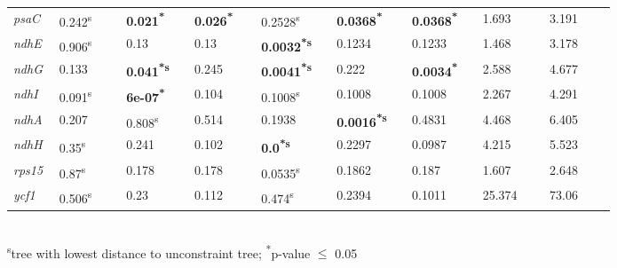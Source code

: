 \documentclass[a4paper]{article}
\begin{document}
\begin{tabular}{p{0.03\linewidth}|p{0.095\linewidth}p{0.095\linewidth}p{0.095\linewidth}|p{0.095\linewidth}p{0.095\linewidth}p{0.095\linewidth}|p{0.095\linewidth}p{0.095\linewidth}}
 \rowcolor{black!20} \textit{psaC} & 0.242\textsuperscript{s} & \textbf{0.021\textsuperscript{*}} & \textbf{0.026\textsuperscript{*}} & 0.2528\textsuperscript{s} & \textbf{0.0368\textsuperscript{*}} & \textbf{0.0368\textsuperscript{*}} & 1.693 & 3.191\\
\textit{ndhE} & 0.906\textsuperscript{s} & 0.13 & 0.13 & \textbf{0.0032\textsuperscript{*}\textsuperscript{s}} & 0.1234 & 0.1233 & 1.468 & 3.178\\
 \rowcolor{black!20} \textit{ndhG} & 0.133 & \textbf{0.041\textsuperscript{*}\textsuperscript{s}} & 0.245 & \textbf{0.0041\textsuperscript{*}\textsuperscript{s}} & 0.222 & \textbf{0.0034\textsuperscript{*}} & 2.588 & 4.677\\
\textit{ndhI} & 0.091\textsuperscript{s} & \textbf{6e-07\textsuperscript{*}} & 0.104 & 0.1008\textsuperscript{s} & 0.1008 & 0.1008 & 2.267 & 4.291\\
 \rowcolor{black!20} \textit{ndhA} & 0.207 & 0.808\textsuperscript{s} & 0.514 & 0.1938 & \textbf{0.0016\textsuperscript{*}\textsuperscript{s}} & 0.4831 & 4.468 & 6.405\\
\textit{ndhH} & 0.35\textsuperscript{s} & 0.241 & 0.102 & \textbf{0.0\textsuperscript{*}\textsuperscript{s}} & 0.2297 & 0.0987 & 4.215 & 5.523\\
 \rowcolor{black!20} \textit{rps15} & 0.87\textsuperscript{s} & 0.178 & 0.178 & 0.0535\textsuperscript{s} & 0.1862 & 0.187 & 1.607 & 2.648\\
\textit{ycf1} & 0.506\textsuperscript{s} & 0.23 & 0.112 & 0.474\textsuperscript{s} & 0.2394 & 0.1011 & 25.374 & 73.06\\
\end{tabular}\\
\textsuperscript{s}tree with lowest distance to unconstraint tree; \textsuperscript{*}p-value $\leq$ 0.05
\end{document}
